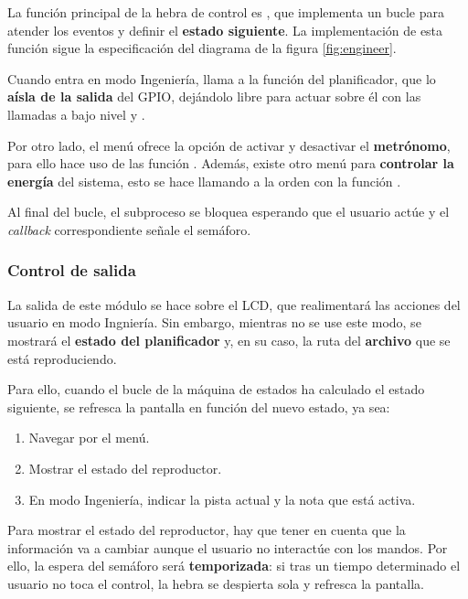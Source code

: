 La función principal de la hebra de control es , que implementa un bucle para atender los eventos y definir el \textbf{estado siguiente}. La implementación de esta función sigue la especificación del diagrama de la figura \ref{fig:engineer}.

Cuando entra en modo Ingeniería, llama a la función  del planificador, que lo \textbf{aísla de la salida} del \acrshort{GPIO}, dejándolo libre para actuar sobre él con las llamadas a bajo nivel  y .

Por otro lado, el menú ofrece la opción de activar y desactivar el \textbf{metrónomo}, para ello hace uso de las función . Además, existe otro menú para \textbf{controlar la energía} del sistema, esto se hace llamando a la orden  con la función .

Al final del bucle, el subproceso se bloquea esperando que el usuario actúe y el \textit{callback} correspondiente señale el semáforo.

\subsubsection{Control de salida}

La salida de este módulo se hace sobre el \acrshort{LCD}, que realimentará las acciones del usuario en modo Ingniería. Sin embargo, mientras no se use este modo, se mostrará el \textbf{estado del planificador} y, en su caso, la ruta del \textbf{archivo} que se está reproduciendo.

Para ello, cuando el bucle de la máquina de estados ha calculado el estado siguiente, se refresca la pantalla en función del nuevo estado, ya sea:

\begin{enumerate}
	\item Navegar por el menú.
	\item Mostrar el estado del reproductor.
	\item En modo Ingeniería, indicar la pista actual y la nota que está activa.
\end{enumerate}

Para mostrar el estado del reproductor, hay que tener en cuenta que la información va a cambiar aunque el usuario no interactúe con los mandos. Por ello, la espera del semáforo será \textbf{temporizada}: si tras un tiempo determinado el usuario no toca el control, la hebra se despierta sola y refresca la pantalla.

